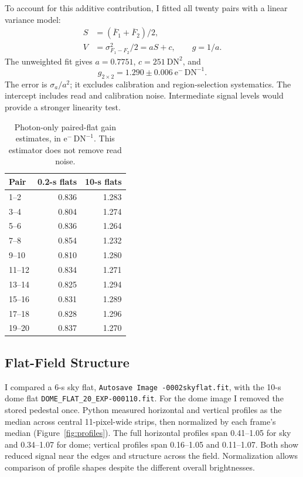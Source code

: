 \documentclass[12pt,letterpaper,twocolumn]{article}
\begin{document}
To account for this additive contribution, I fitted all twenty pairs
with a linear variance model:
\begin{align}
S&=(\overline F_1+\overline F_2)/2,\\
V&=\sigma_{F_1-F_2}^2/2=aS+c,\qquad g=1/a.
\end{align}
The unweighted fit gives $a=0.7751$, $c=251~\mathrm{DN^2}$, and
\begin{equation}
\boxed{g_{2\times2}=1.290\pm0.006~\mathrm{e^-\,DN^{-1}}}.
\end{equation}
The error is $\sigma_a/a^2$; it excludes calibration and region-selection
systematics. The intercept includes read and calibration noise.
Intermediate signal levels would provide a stronger linearity test.
\begin{table}[htbp]
 \centering\small
 \caption{Photon-only paired-flat gain estimates, in
 $\mathrm{e^-\,DN^{-1}}$.
 This estimator does not remove read noise.}
 \label{tab:b_gain_pairs}
 \begin{tabular}{lrr}
  \toprule
  Pair & 0.2-s flats & 10-s flats\\
  \midrule
  1--2   & 0.836 & 1.283\\
  3--4   & 0.804 & 1.274\\
  5--6   & 0.836 & 1.264\\
  7--8   & 0.854 & 1.232\\
  9--10  & 0.810 & 1.280\\
  11--12 & 0.834 & 1.271\\
  13--14 & 0.825 & 1.294\\
  15--16 & 0.831 & 1.289\\
  17--18 & 0.828 & 1.296\\
  19--20 & 0.837 & 1.270\\
  \bottomrule
 \end{tabular}
\end{table}


\subsection{Flat-Field Structure}
I compared a 6-s sky flat, \nolinkurl{Autosave Image -0002skyflat.fit},
with the 10-s dome flat \nolinkurl{DOME_FLAT_20_EXP-000110.fit}.
For the dome image I removed the stored pedestal once. Python measured horizontal and vertical profiles as the median across central 11-pixel-wide strips, then
normalized by each frame's median (Figure~\ref{fig:profiles}).
The full horizontal profiles span 0.41--1.05 for sky and 0.34--1.07
for dome; vertical profiles span 0.16--1.05 and 0.11--1.07.
Both show reduced signal near the edges and structure across the field. Normalization allows comparison of profile shapes despite the different overall brightnesses.
\end{document}

